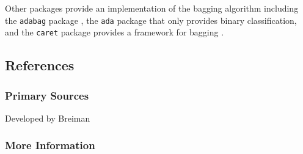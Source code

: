 Other packages provide an implementation of the bagging algorithm including the \texttt{adabag} package \cite{Cortes2011}, the \texttt{ada} package that only provides binary classification, and the \texttt{caret} package provides a framework for bagging \cite{Kuhn2011}.

\subsection{References}

\subsubsection{Primary Sources}

Developed by Breiman \cite{Breiman1996}

\subsubsection{More Information}



